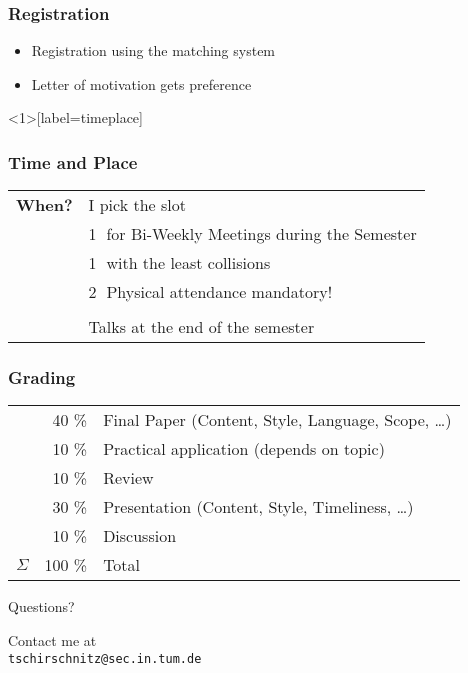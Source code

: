 \documentclass[xcolor={usenames,dvipsnames}]{beamer}
\begin{document}
\begin{frame}
	\frametitle{Registration}
	\begin{itemize}
		\item Registration using the \alert{matching system}
	  	\item Letter of motivation gets preference
	\end{itemize}
\end{frame}

\begin{frame}<1>[label=timeplace]
	\frametitle{Time and Place}
	\begin{center}
		\begin{tabular}{ll}
		        \textbf{When?}  & I pick the slot\\
		        						&\textcircled{1} for Bi-Weekly Meetings during the Semester\\
		        						&\textcircled{1} with the least collisions\\
		        						&\textcircled{2} Physical attendance mandatory!\\
					&\\
					& Talks at the \alert{end} of the semester \\
		\end{tabular}
	\end{center}
\end{frame}


\begin{frame}
\frametitle{Grading}
  \begin{tabular}{lrl}
             & \alert{40 \%}   & Final Paper (Content, Style, Language, Scope, \ldots)\\
	     		 & \alert{10 \%}   & Practical application (depends on topic)  \\
             & \alert{10 \%}   & Review      \\
             & \alert{30 \%}   & Presentation (Content, Style, Timeliness, \ldots) \\
             & \alert{10 \%}   & Discussion                                                   \\
    \midrule
	$\Sigma$ & \alert{100 \%}  & Total                                                        \\
  \end{tabular}
\end{frame}

\begin{frame}
	\begin{center}
		{\huge Questions?}

		\vspace{2cm}

		\begin{center}
			Contact me at \\ \texttt{tschirschnitz@sec.in.tum.de}
		\end{center}

		\vspace{1cm}
	\end{center}
\end{frame}
\end{document}
